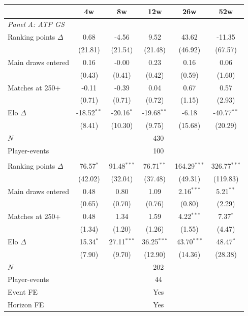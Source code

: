 \begin{tabular}{l c c c c c}
\toprule
 & 4w & 8w & 12w & 26w & 52w \\
\midrule
\multicolumn{6}{l}{\textit{Panel A: ATP GS}} \\
Ranking points $\Delta$ & 0.68 & -4.56 & 9.52 & 43.62 & -11.35 \\
 & (21.81) & (21.54) & (21.48) & (46.92) & (67.57) \\
\addlinespace
Main draws entered & 0.16 & -0.00 & 0.23 & 0.16 & 0.06 \\
 & (0.43) & (0.41) & (0.42) & (0.59) & (1.60) \\
\addlinespace
Matches at 250+ & -0.11 & -0.39 & 0.04 & 0.67 & 0.57 \\
 & (0.71) & (0.71) & (0.72) & (1.15) & (2.93) \\
\addlinespace
Elo $\Delta$ & -18.52$^{**}$ & -20.16$^{*}$ & -19.68$^{**}$ & -6.18 & -40.77$^{**}$ \\
 & (8.41) & (10.30) & (9.75) & (15.68) & (20.29) \\
\addlinespace
$N$ & \multicolumn{5}{c}{430} \\
Player-events & \multicolumn{5}{c}{100} \\
\addlinespace
\multicolumn{6}{l}{\textit{Panel B: WTA GS}} \\
Ranking points $\Delta$ & 76.57$^{*}$ & 91.48$^{***}$ & 76.71$^{**}$ & 164.29$^{***}$ & 326.77$^{***}$ \\
 & (42.02) & (32.04) & (37.48) & (49.31) & (119.83) \\
\addlinespace
Main draws entered & 0.48 & 0.80 & 1.09 & 2.16$^{***}$ & 5.21$^{**}$ \\
 & (0.65) & (0.70) & (0.76) & (0.80) & (2.29) \\
\addlinespace
Matches at 250+ & 0.48 & 1.34 & 1.59 & 4.22$^{***}$ & 7.37$^{*}$ \\
 & (1.34) & (1.20) & (1.26) & (1.55) & (4.47) \\
\addlinespace
Elo $\Delta$ & 15.34$^{*}$ & 27.11$^{***}$ & 36.25$^{***}$ & 43.70$^{***}$ & 48.47$^{*}$ \\
 & (7.90) & (9.70) & (12.90) & (14.36) & (28.38) \\
\addlinespace
$N$ & \multicolumn{5}{c}{202} \\
Player-events & \multicolumn{5}{c}{44} \\
\addlinespace
\midrule
Event FE & \multicolumn{5}{c}{Yes} \\
Horizon FE & \multicolumn{5}{c}{Yes} \\
\bottomrule
\end{tabular}
